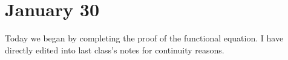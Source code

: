 \documentclass[../notes.tex]{subfiles}
\begin{document}
\section{January 30}

Today we began by completing the proof of the functional equation. I have directly edited into last class's notes for continuity reasons.

\end{document}
